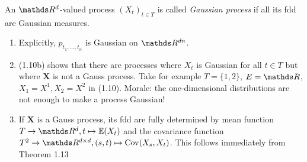 \begin{defi}
An $\Rd$-valued process $(X_t)_{t \in T}$ is called \emph{Gaussian process} if all its fdd are Gaussian measures.
\end{defi}

\begin{bem}
\begin{enumerate}[label=(\alph*)]
\item Explicitly, $p_{t_1,\dots , t_n}$ is Gaussian on $\R^{dn}$.
\item (1.10b) shows that there are processes where $X_t$ is Gaussian for all $t\in T$ but where $\textbf{X}$ is not a Gauss process. Take for example $T=\{1,2\}$, $E=\R$, $X_1=X^1,X_2=X^2$ in (1.10).
Morale: the one-dimensional distributions are not enough to make a process Gaussian!
\item If $\textbf{X}$ is a Gauss process, its fdd are fully determined by mean function $T \to \Rd, t \mapsto \E{X_t}$ and the covariance function $T^2\to \R^{d\times d}, (s,t) \mapsto \Cov(X_s,X_t)$.
This follows immediately from Theorem 1.13
\qedhere
\end{enumerate}
\end{bem}


